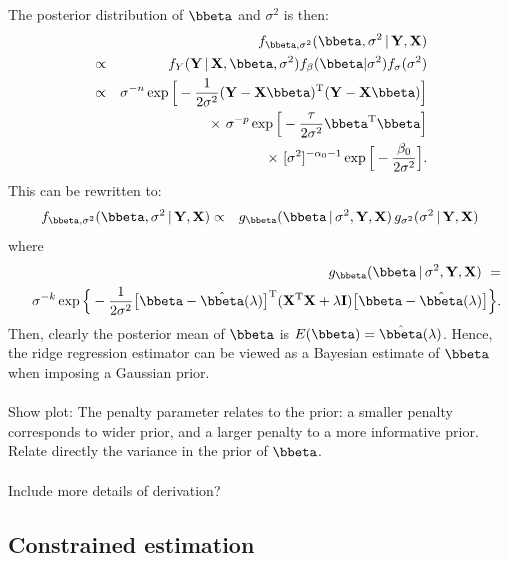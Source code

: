 \documentclass[a4paper]{article}
\theoremstyle{myexamplestyle}
\begin{document}
The posterior distribution of $\bbeta$ and $\sigma^2$ is then:
\begin{eqnarray*}
& & \hspace{-1.5cm} f_{\bbeta, \sigma^2} (\bbeta, \sigma^2 \, | \, \mathbf{Y}, \mathbf{X})
\\
& \propto & f_Y (\mathbf{Y} \, | \, \mathbf{X}, \bbeta, \sigma^2) f_{\beta}(\bbeta | \sigma^2) f_{\sigma}(\sigma^2)
\\
& \propto & \sigma^{-n} \exp \Big[ - \frac{1}{2\sigma^2} ( \mathbf{Y} - \mathbf{X} \bbeta)^{\mathrm{T}} ( \mathbf{Y} - \mathbf{X} \bbeta) \Big]
\\
&  & \times \, \, \sigma^{-p} \exp \Big[ - \frac{\tau}{2\sigma^2} \bbeta^{\mathrm{T}} \bbeta \Big]
\\
&  & \times \, \, [\sigma^2]^{-\alpha_0-1} \exp \Big[ - \frac{\beta_0}{2\sigma^2} \Big].
\end{eqnarray*}
This can be rewritten to:
\begin{eqnarray*}
f_{\bbeta, \sigma^2} (\bbeta, \sigma^2 \, | \, \mathbf{Y}, \mathbf{X})
& \propto & g_{\bbeta} (\bbeta \, | \, \sigma^2, \mathbf{Y}, \mathbf{X}) \,
g_{\sigma^2} (\sigma^2 \, | \, \mathbf{Y}, \mathbf{X})
\end{eqnarray*}
where
\begin{eqnarray*}
& & \hspace{-1.5cm} g_{\bbeta} (\bbeta \, | \, \sigma^2, \mathbf{Y}, \mathbf{X}) \, \, =
\\
&   &  \sigma^{-k} \exp \Big\{ - \frac{1}{2\sigma^2} \big[ \bbeta - \hat{\bbeta}(\lambda) \big]^{\mathrm{T}}
(\mathbf{X}^{\mathrm{T}} \mathbf{X} + \lambda \mathbf{I}) \big[ \bbeta - \hat{\bbeta}(\lambda) \big] \Big\}.
\end{eqnarray*}
Then, clearly the posterior mean of $\bbeta$ is $E(\bbeta) = \hat{\bbeta}(\lambda)$. Hence, the ridge regression estimator can be viewed as a Bayesian estimate of $\bbeta$  when imposing a Gaussian prior.
\\
\\
Show plot: The penalty parameter relates to the prior: a smaller penalty corresponds to wider prior, and a larger penalty to a more informative prior. Relate directly the variance in the prior of $\bbeta$.
\\
\\
Include more details of derivation?



\subsection{Constrained estimation}
\end{document}
